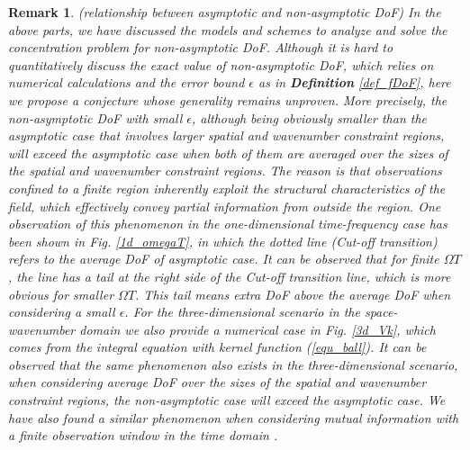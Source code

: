 \documentclass[12pt,draftclsnofoot,journal,onecolumn]{IEEEtran}
\newtheorem{remark}{Remark}
\begin{document}
{
	\color{red}
	\begin{remark}
		(relationship between asymptotic and non-asymptotic DoF) In the above parts, we have discussed the models and schemes to analyze and solve the concentration problem for non-asymptotic DoF. Although it is hard to quantitatively discuss the exact value of non-asymptotic DoF, which relies on numerical calculations and the error bound $\epsilon$ as in {\bf Definition} \ref{def_fDoF}, here we propose a conjecture whose generality remains unproven. More precisely, the non-asymptotic DoF with small $\epsilon$, although being obviously smaller than the asymptotic case that involves larger spatial and wavenumber constraint regions, will exceed the asymptotic case when both of them are averaged over the sizes of the spatial and wavenumber constraint regions. The reason is that observations confined to a finite region inherently exploit the structural characteristics of the field, which effectively convey partial information from outside the region. One observation of this phenomenon in the one-dimensional time-frequency case has been shown in Fig. \ref{1d_omegaT}, in which the dotted line (Cut-off transition) refers to the average DoF of asymptotic case. It can be observed that for finite $\Omega T$, the line has a tail at the right side of the Cut-off transition line, which is more obvious for smaller $\Omega T$. This tail means extra DoF above the average DoF when considering a small $\epsilon$. For the three-dimensional scenario in the space-wavenumber domain we also provide a numerical case in Fig. \ref{3d_Vk}, which comes from the integral equation with kernel function (\ref{equ_ball}). It can be observed that the same phenomenon also exists in the three-dimensional scenario, when considering average DoF over the sizes of the spatial and wavenumber constraint regions, the non-asymptotic case will exceed the asymptotic case. We have also found a similar phenomenon when considering mutual information with a finite observation window in the time domain \cite{zhujieao22ISIT}.


\end{remark}}
\end{document}

